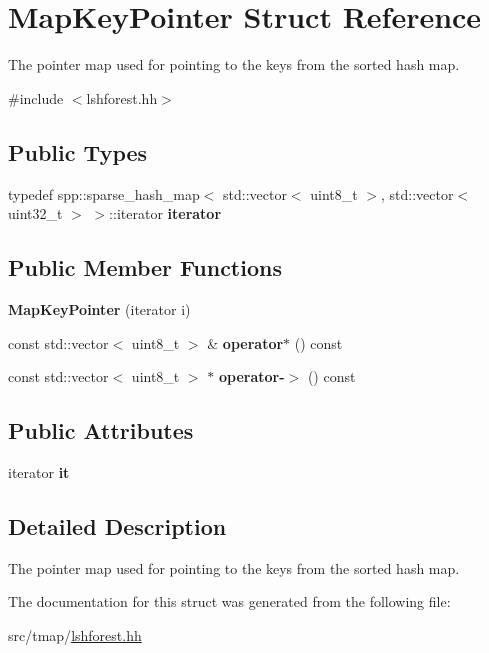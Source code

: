 \hypertarget{structMapKeyPointer}{}\section{Map\+Key\+Pointer Struct Reference}
\label{structMapKeyPointer}


The pointer map used for pointing to the keys from the sorted hash map.  




{\ttfamily \#include $<$lshforest.\+hh$>$}

\subsection*{Public Types}
\begin{DoxyCompactItemize}
\item 
\mbox{\label{structMapKeyPointer_ae2724283aeda91caa9e63c5653be4a65}} 
typedef spp\+::sparse\+\_\+hash\+\_\+map$<$ std\+::vector$<$ uint8\+\_\+t $>$, std\+::vector$<$ uint32\+\_\+t $>$ $>$\+::iterator {\bfseries iterator}
\end{DoxyCompactItemize}
\subsection*{Public Member Functions}
\begin{DoxyCompactItemize}
\item 
\mbox{\label{structMapKeyPointer_a96ac4dd95d58f8e79be1e5c9c247b349}} 
{\bfseries Map\+Key\+Pointer} (iterator i)
\item 
\mbox{\label{structMapKeyPointer_a481cd84d48f25f2ff4bd102103a226d2}} 
const std\+::vector$<$ uint8\+\_\+t $>$ \& {\bfseries operator$\ast$} () const
\item 
\mbox{\label{structMapKeyPointer_adf3870c8bdd7c9953fb07bb8708a7e73}} 
const std\+::vector$<$ uint8\+\_\+t $>$ $\ast$ {\bfseries operator-\/$>$} () const
\end{DoxyCompactItemize}
\subsection*{Public Attributes}
\begin{DoxyCompactItemize}
\item 
\mbox{\label{structMapKeyPointer_ab507d3d701fc46728b0ee1643e510edb}} 
iterator {\bfseries it}
\end{DoxyCompactItemize}


\subsection{Detailed Description}
The pointer map used for pointing to the keys from the sorted hash map. 

The documentation for this struct was generated from the following file\+:\begin{DoxyCompactItemize}
\item 
src/tmap/\hyperlink{lshforest_8hh}{lshforest.\+hh}\end{DoxyCompactItemize}
